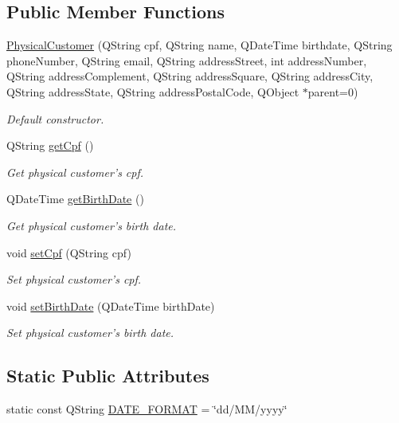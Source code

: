 \subsection*{\-Public \-Member \-Functions}
\begin{DoxyCompactItemize}
\item 
\hyperlink{class_physical_customer_a3b453730c026213aefc519ade61b19e6}{\-Physical\-Customer} (\-Q\-String cpf, \-Q\-String name, \-Q\-Date\-Time birthdate, \-Q\-String phone\-Number, \-Q\-String email, \-Q\-String address\-Street, int address\-Number, \-Q\-String address\-Complement, \-Q\-String address\-Square, \-Q\-String address\-City, \-Q\-String address\-State, \-Q\-String address\-Postal\-Code, \-Q\-Object $\ast$parent=0)
\begin{DoxyCompactList}\small\item\em \-Default constructor. \end{DoxyCompactList}\item 
\-Q\-String \hyperlink{class_physical_customer_a573e7b6f2be5c56e8c884874e4d59f6c}{get\-Cpf} ()
\begin{DoxyCompactList}\small\item\em \-Get physical customer's cpf. \end{DoxyCompactList}\item 
\-Q\-Date\-Time \hyperlink{class_physical_customer_ac430e8c4b009aa13d762aefb36d44f30}{get\-Birth\-Date} ()
\begin{DoxyCompactList}\small\item\em \-Get physical customer's birth date. \end{DoxyCompactList}\item 
void \hyperlink{class_physical_customer_a977b839012545099ef2b6e1b01a26b33}{set\-Cpf} (\-Q\-String cpf)
\begin{DoxyCompactList}\small\item\em \-Set physical customer's cpf. \end{DoxyCompactList}\item 
void \hyperlink{class_physical_customer_a5da081d4b086b017d3d62073753d6123}{set\-Birth\-Date} (\-Q\-Date\-Time birth\-Date)
\begin{DoxyCompactList}\small\item\em \-Set physical customer's birth date. \end{DoxyCompactList}\end{DoxyCompactItemize}
\subsection*{\-Static \-Public \-Attributes}
\begin{DoxyCompactItemize}
\item 
static const \-Q\-String \hyperlink{class_physical_customer_a1aadc9fd1fde92bdadddd8853beb7d74}{\-D\-A\-T\-E\-\_\-\-F\-O\-R\-M\-A\-T} = \char`\"{}dd/\-M\-M/yyyy\char`\"{}
\end{DoxyCompactItemize}


